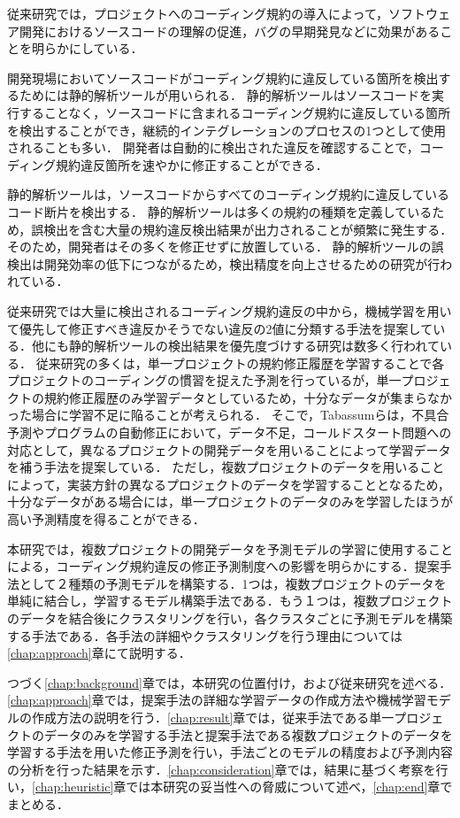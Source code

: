 \documentclass[submit,noauthor,dvipdfmx]{ipsj}
\begin{document}
従来研究では，プロジェクトへのコーディング規約の導入によって，ソフトウェア開発におけるソースコードの理解の促進，バグの早期発見などに効果があることを明らかにしている\cite{Beller2}\cite{Johnson}\cite{Beller}．

開発現場においてソースコードがコーディング規約に違反している箇所を検出するためには静的解析ツールが用いられる．
静的解析ツールはソースコードを実行することなく，ソースコードに含まれるコーディング規約に違反している箇所を検出することができ，継続的インテグレーションのプロセスの1つとして使用されることも多い．
開発者は自動的に検出された違反を確認することで，コーディング規約違反箇所を速やかに修正することができる．

静的解析ツールは，ソースコードからすべてのコーディング規約に違反しているコード断片を検出する．
静的解析ツールは多くの規約の種類を定義しているため，誤検出を含む大量の規約違反検出結果が出力されることが頻繁に発生する．
そのため，開発者はその多くを修正せずに放置している．
静的解析ツールの誤検出は開発効率の低下につながるため，検出精度を向上させるための研究が行われている\cite{Nguyen}．

従来研究では大量に検出されるコーディング規約違反の中から，機械学習を用いて優先して修正すべき違反かそうでない違反の2値に分類する手法を提案している\cite{JyuraiPre}．他にも静的解析ツールの検出結果を優先度づけする研究は数多く行われている．
従来研究の多くは，単一プロジェクトの規約修正履歴を学習することで各プロジェクトのコーディングの慣習を捉えた予測を行っているが，単一プロジェクトの規約修正履歴のみ学習データとしているため，十分なデータが集まらなかった場合に学習不足に陥ることが考えられる．
そこで，Tabassumらは，不具合予測やプログラムの自動修正において，データ不足，コールドスタート問題への対応として，異なるプロジェクトの開発データを用いることによって学習データを補う手法を提案している\cite{Tabassum}．
ただし，複数プロジェクトのデータを用いることによって，実装方針の異なるプロジェクトのデータを学習することとなるため，十分なデータがある場合には，単一プロジェクトのデータのみを学習したほうが高い予測精度を得ることができる．

本研究では，複数プロジェクトの開発データを予測モデルの学習に使用することによる，コーディング規約違反の修正予測制度への影響を明らかにする．提案手法として２種類の予測モデルを構築する．1つは，複数プロジェクトのデータを単純に結合し，学習するモデル構築手法である．もう１つは，複数プロジェクトのデータを結合後にクラスタリングを行い，各クラスタごとに予測モデルを構築する手法である．各手法の詳細やクラスタリングを行う理由については\ref{chap:approach}章にて説明する．

つづく\ref{chap:background}章では，本研究の位置付け，および従来研究を述べる．\ref{chap:approach}章では，提案手法の詳細な学習データの作成方法や機械学習モデルの作成方法の説明を行う．\ref{chap:result}章では，従来手法である単一プロジェクトのデータのみを学習する手法と提案手法である複数プロジェクトのデータを学習する手法を用いた修正予測を行い，手法ごとのモデルの精度および予測内容の分析を行った結果を示す．\ref{chap:consideration}章では，結果に基づく考察を行い，\ref{chap:heuristic}章では本研究の妥当性への脅威について述べ，\ref{chap:end}章でまとめる．
\end{document}
